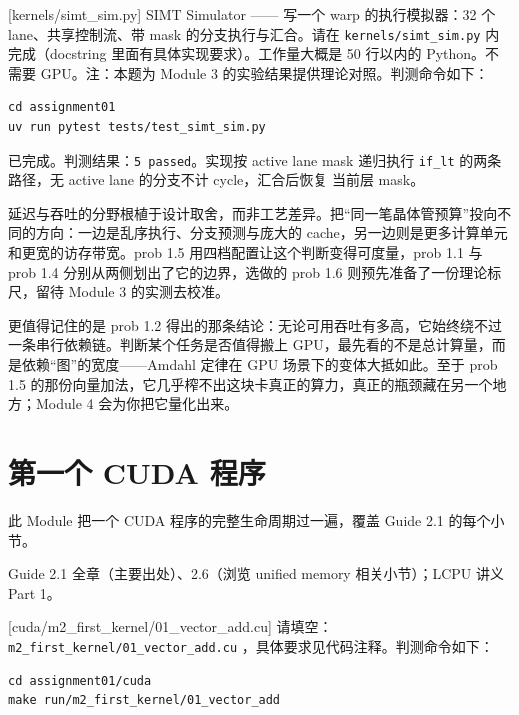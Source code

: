 \documentclass[11pt,a4paper,fontset=fandol]{ctexart}
\begin{document}
[kernels/simt\_sim.py]
SIMT Simulator —— 写一个 warp 的执行模拟器：32 个 lane、共享控制流、带 mask 的分支执行与汇合。请在 \texttt{kernels/simt\_sim.py} 内完成（docstring 里面有具体实现要求）。工作量大概是 50 行以内的 Python。不需要 GPU。注：本题为 Module 3 的实验结果提供理论对照。判测命令如下：

\begin{lstlisting}
cd assignment01
uv run pytest tests/test_simt_sim.py
\end{lstlisting}

\begin{answer}
已完成。判测结果：\texttt{5 passed}。实现按 active lane mask 递归执行
\texttt{if\_lt} 的两条路径，无 active lane 的分支不计 cycle，汇合后恢复
当前层 mask。
\end{answer}

\begin{lookback}
延迟与吞吐的分野根植于设计取舍，而非工艺差异。把“同一笔晶体管预算”投向不同的方向：一边是乱序执行、分支预测与庞大的 cache，另一边则是更多计算单元和更宽的访存带宽。prob 1.5 用四档配置让这个判断变得可度量，prob 1.1 与 prob 1.4 分别从两侧划出了它的边界，选做的 prob 1.6 则预先准备了一份理论标尺，留待 Module 3 的实测去校准。

更值得记住的是 prob 1.2 得出的那条结论：无论可用吞吐有多高，它始终绕不过一条串行依赖链。判断某个任务是否值得搬上 GPU，最先看的不是总计算量，而是依赖“图”的宽度——Amdahl 定律在 GPU 场景下的变体大抵如此。至于 prob 1.5 的那份向量加法，它几乎榨不出这块卡真正的算力，真正的瓶颈藏在另一个地方；Module 4 会为你把它量化出来。
\end{lookback}

\section{第一个 CUDA 程序}

此 Module 把一个 CUDA 程序的完整生命周期过一遍，覆盖 Guide 2.1 的每个小节。

\begin{reading}
Guide 2.1 全章（主要出处）、2.6（浏览 unified memory 相关小节）；LCPU 讲义 Part 1。
\end{reading}

[cuda/m2\_first\_kernel/01\_vector\_add.cu]
请填空：\texttt{m2\_first\_kernel/01\_vector\_add.cu} ，具体要求见代码注释。判测命令如下：

\begin{lstlisting}
cd assignment01/cuda
make run/m2_first_kernel/01_vector_add
\end{lstlisting}
\end{document}
